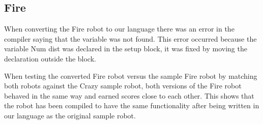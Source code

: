 \subsection{Fire}
When converting the Fire robot to our language there was an error in the compiler saying that the variable was not found. This error occurred because the variable Num dist was declared in the setup block, it was fixed by moving the declaration outside the block.

When testing the converted Fire robot versus the sample Fire robot by matching both robots against the Crazy sample robot, both versions of the Fire robot behaved in the same way and earned scores close to each other.
This shows that the robot has been compiled to have the same functionality after being written in our language as the original sample robot.


